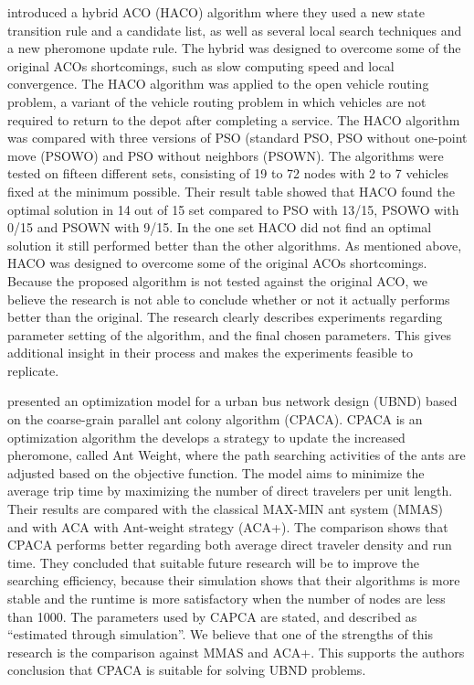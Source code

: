 \citet{sedighpour14} introduced a hybrid ACO (HACO) algorithm where they used a new state transition rule and a candidate list, as well as several local search techniques and a new pheromone update rule. The hybrid was designed to overcome some of the original ACOs shortcomings, such as slow computing speed and local convergence. The HACO algorithm was applied to the open vehicle routing problem, a variant of the vehicle routing problem in which vehicles are not required to return to the depot after completing a service. The HACO algorithm was compared with three versions of PSO (standard PSO, PSO without one-point move (PSOWO) and PSO without neighbors (PSOWN). The algorithms were tested on fifteen different sets, consisting of 19 to 72 nodes with 2 to 7 vehicles fixed at the minimum possible. Their result table showed that HACO found the optimal solution in 14 out of 15 set compared to PSO with 13/15, PSOWO with 0/15 and PSOWN with 9/15. In the one set HACO did not find an optimal solution it still performed better than the other algorithms. As mentioned above, HACO was designed to overcome some of the original ACOs shortcomings. Because the proposed algorithm is not tested against the original ACO, we believe the research is not able to conclude whether or not it actually performs better than the original. The research clearly describes experiments regarding parameter setting of the algorithm, and the final chosen parameters. This gives additional insight in their process and makes the experiments feasible to replicate.





\citet{yang07} presented an optimization model for a urban bus network design (UBND) based on the coarse-grain parallel ant colony algorithm (CPACA). CPACA is an optimization algorithm the develops a strategy to update the increased pheromone, called Ant Weight, where the path searching activities of the ants are adjusted based on the objective function. The model aims to minimize the average trip time by maximizing the number of direct travelers per unit length. Their results are compared with the classical MAX-MIN ant system (MMAS)\citep{stutzle99} and with ACA with Ant-weight strategy (ACA+). The comparison shows that CPACA performs better regarding both average direct traveler density and run time. They concluded that suitable future research will be to improve the searching efficiency, because their simulation shows that their algorithms is more stable and the runtime is more satisfactory when the number of nodes are less than 1000. The parameters used by CAPCA are stated, and described as ``estimated through simulation''. We believe that one of the strengths of this research is the comparison against MMAS and ACA+. This supports the authors conclusion that CPACA is suitable for solving UBND problems.   

